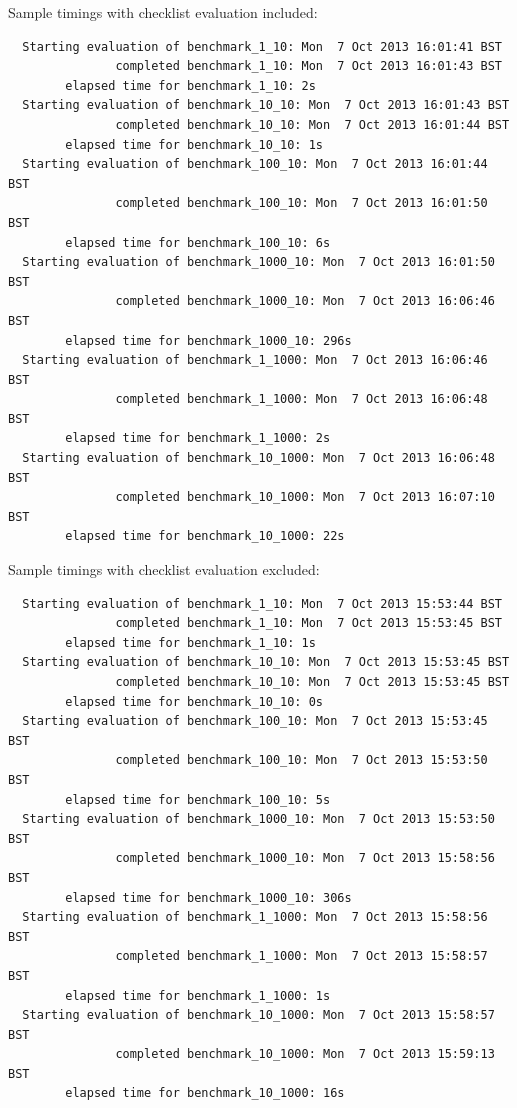 Sample timings with checklist evaluation included:

\begin{verbatim}
  Starting evaluation of benchmark_1_10: Mon  7 Oct 2013 16:01:41 BST
               completed benchmark_1_10: Mon  7 Oct 2013 16:01:43 BST
        elapsed time for benchmark_1_10: 2s
  Starting evaluation of benchmark_10_10: Mon  7 Oct 2013 16:01:43 BST
               completed benchmark_10_10: Mon  7 Oct 2013 16:01:44 BST
        elapsed time for benchmark_10_10: 1s
  Starting evaluation of benchmark_100_10: Mon  7 Oct 2013 16:01:44 BST
               completed benchmark_100_10: Mon  7 Oct 2013 16:01:50 BST
        elapsed time for benchmark_100_10: 6s
  Starting evaluation of benchmark_1000_10: Mon  7 Oct 2013 16:01:50 BST
               completed benchmark_1000_10: Mon  7 Oct 2013 16:06:46 BST
        elapsed time for benchmark_1000_10: 296s
  Starting evaluation of benchmark_1_1000: Mon  7 Oct 2013 16:06:46 BST
               completed benchmark_1_1000: Mon  7 Oct 2013 16:06:48 BST
        elapsed time for benchmark_1_1000: 2s
  Starting evaluation of benchmark_10_1000: Mon  7 Oct 2013 16:06:48 BST
               completed benchmark_10_1000: Mon  7 Oct 2013 16:07:10 BST
        elapsed time for benchmark_10_1000: 22s
\end{verbatim}

Sample timings with checklist evaluation excluded:

\begin{verbatim}
  Starting evaluation of benchmark_1_10: Mon  7 Oct 2013 15:53:44 BST
               completed benchmark_1_10: Mon  7 Oct 2013 15:53:45 BST
        elapsed time for benchmark_1_10: 1s
  Starting evaluation of benchmark_10_10: Mon  7 Oct 2013 15:53:45 BST
               completed benchmark_10_10: Mon  7 Oct 2013 15:53:45 BST
        elapsed time for benchmark_10_10: 0s
  Starting evaluation of benchmark_100_10: Mon  7 Oct 2013 15:53:45 BST
               completed benchmark_100_10: Mon  7 Oct 2013 15:53:50 BST
        elapsed time for benchmark_100_10: 5s
  Starting evaluation of benchmark_1000_10: Mon  7 Oct 2013 15:53:50 BST
               completed benchmark_1000_10: Mon  7 Oct 2013 15:58:56 BST
        elapsed time for benchmark_1000_10: 306s
  Starting evaluation of benchmark_1_1000: Mon  7 Oct 2013 15:58:56 BST
               completed benchmark_1_1000: Mon  7 Oct 2013 15:58:57 BST
        elapsed time for benchmark_1_1000: 1s
  Starting evaluation of benchmark_10_1000: Mon  7 Oct 2013 15:58:57 BST
               completed benchmark_10_1000: Mon  7 Oct 2013 15:59:13 BST
        elapsed time for benchmark_10_1000: 16s
\end{verbatim}

